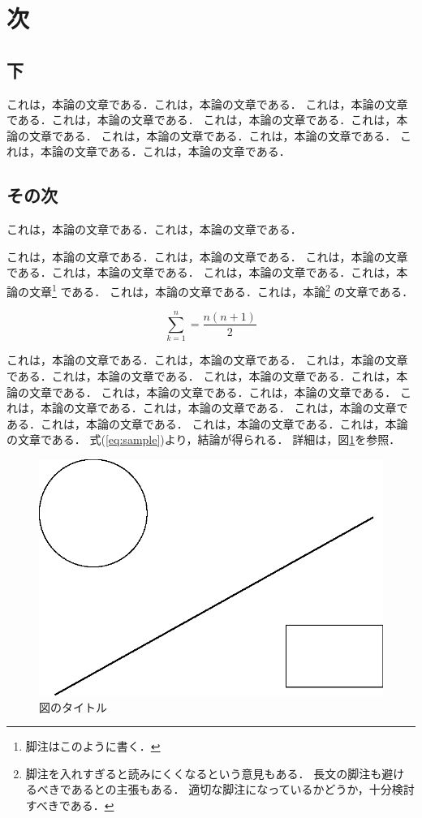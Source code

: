 \section{次}

\subsection{下}

これは，本論の文章である．これは，本論の文章である．
これは，本論の文章である．これは，本論の文章である．
これは，本論の文章である．これは，本論の文章である．
これは，本論の文章である．これは，本論の文章である．
これは，本論の文章である．これは，本論の文章である．

\subsection{その次}

これは，本論の文章である．これは，本論の文章である．

これは，本論の文章である．これは，本論の文章である．
これは，本論の文章である．これは，本論の文章である．
これは，本論の文章である．これは，本論の文章\footnote{
  脚注はこのように書く．}
である．
これは，本論の文章である．これは，本論\footnote{
  脚注を入れすぎると読みにくくなるという意見もある．
  長文の脚注も避けるべきであるとの主張もある．
  適切な脚注になっているかどうか，十分検討すべきである．}
の文章である．

\begin{equation}\label{eq:sample}
  \sum_{k = 1}^{n} = \frac{n(n+1)}{2}
\end{equation}

これは，本論の文章である．これは，本論の文章である．
これは，本論の文章である．これは，本論の文章である．
これは，本論の文章である．これは，本論の文章である．
これは，本論の文章である．これは，本論の文章である．
これは，本論の文章である．これは，本論の文章である．
これは，本論の文章である．これは，本論の文章である．
これは，本論の文章である．これは，本論の文章である．
式(\ref{eq:sample})より，結論が得られる．
詳細は，図\ref{figure:sample}を参照．

\begin{figure}[tbp]
  \begin{center}
    \includegraphics[width=0.5\columnwidth]{fig.eps}
  \end{center}
  \caption{\label{figure:sample}図のタイトル}
\end{figure}

